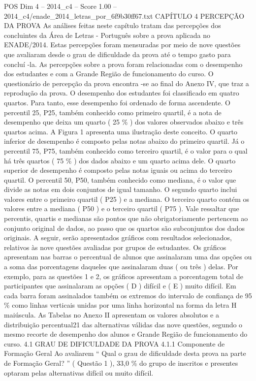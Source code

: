 \begin{textsample}{POS Dim 4 – 2014\_c4 – Score 1.00 – 2014\_c4/enade\_2014\_letras\_por\_6f9b30ff67.txt}  \label{ex:f4_pos_206}
CAPÍTULO 4 PERCEPÇÃO DA PROVA As análises feitas neste capítulo tratam das percepções dos concluintes da Área de Letras - Português sobre a prova aplicada no ENADE/2014.
Estas percepções foram mensuradas por meio de nove questões que avaliaram desde o grau de dificuldade da prova até o tempo gasto para concluí -la.
As percepções sobre a prova foram relacionadas com o desempenho dos estudantes e com a Grande Região de funcionamento do curso.
O questionário de percepção da prova encontra -se ao final do Anexo IV, que traz a reprodução da prova.
O desempenho dos estudantes foi classificado em quatro quartos.
Para tanto, esse desempenho foi ordenado de forma ascendente.
O percentil 25, P25, também conhecido como primeiro quartil, é a nota de desempenho que deixa um quarto ( 25 \% ) dos valores observados abaixo e três quartos acima.
A Figura 1 apresenta uma ilustração deste conceito.
O quarto inferior de desempenho é composto pelas notas abaixo do primeiro quartil.
Já o percentil 75, P75, também conhecido como terceiro quartil, é o valor para o qual há três quartos ( 75 \% ) dos dados abaixo e um quarto acima dele.
O quarto superior de desempenho é composto pelas notas iguais ou acima do terceiro quartil.
O percentil 50, P50, também conhecido como mediana, é o valor que divide as notas em dois conjuntos de igual tamanho.
O segundo quarto inclui valores entre o primeiro quartil ( P25 ) e a mediana.
O terceiro quarto contém os valores entre a mediana ( P50 ) e o terceiro quartil ( P75 ).
Vale ressaltar que percentis, quartis e medianas são pontos que não obrigatoriamente pertencem ao conjunto original de dados, ao passo que os quartos são subconjuntos dos dados originais.
A seguir, serão apresentados gráficos com resultados selecionados, relativos às nove questões avaliadas por grupos de estudantes.
Os gráficos apresentam nas barras o percentual de alunos que assinalaram uma das opções ou a soma das porcentagens daqueles que assinalaram duas ( ou três ) delas.
Por exemplo, para as questões 1 e 2, os gráficos apresentam a porcentagem total de participantes que assinalaram as opções ( D ) difícil e ( E ) muito difícil.
Em cada barra foram assinalados também os extremos do intervalo de confiança de 95 \% como linhas verticais unidas por uma linha horizontal na forma da letra H maiúscula.
As Tabelas no Anexo II apresentam os valores absolutos e a distribuição percentual21 das alternativas válidas das nove questões, segundo o mesmo recorte de desempenho dos alunos e Grande Região de funcionamento do curso. 4.1 GRAU DE DIFICULDADE DA PROVA 4.1.1 Componente de Formação Geral Ao avaliarem “ Qual o grau de dificuldade desta prova na parte de Formação Geral? ” ( Questão 1 ), 33,0 \% do grupo de inscritos e presentes optaram pelas alternativas difícil ou muito difícil.

\end{textsample}
